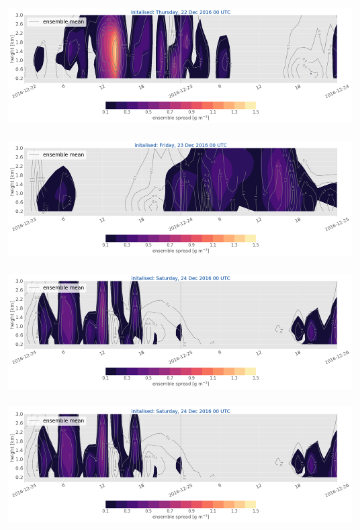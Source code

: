\begin{figure}[t]\ContinuedFloat        
	\begin{subfigure}[t]{\textwidth}		\includegraphics[trim={0.cm 5.3cm 0cm 0cm},clip,width=\textwidth]{./fig_ensemble_spread/20161222}
		\caption{}\label{fig:ens_spread22}
	\end{subfigure}
	\begin{subfigure}[t]{\textwidth}		\includegraphics[trim={0.cm 5.3cm 0cm 0cm},clip,width=\textwidth]{./fig_ensemble_spread/20161223}
		\caption{}\label{fig:ens_spread23}
	\end{subfigure}   
	\begin{subfigure}[t]{\textwidth}		\includegraphics[trim={0.cm 5.3cm 0cm 0cm},clip,width=\textwidth]{./fig_ensemble_spread/20161224}
		\caption{}\label{fig:ens_spread24}
	\end{subfigure}        
	\begin{subfigure}[t]{\textwidth}		\includegraphics[trim={15.cm 0cm 15cm 21cm},clip,width=\textwidth]{./fig_ensemble_spread/20161224}
	\end{subfigure}
\end{figure}
